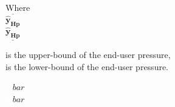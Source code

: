 \begin{minipage}[t]{0.20\textwidth}
Where\\
\hspace*{8mm} $ \overline{\bm{\hat{y}_{Hp}}} $ \\
\hspace*{8mm} $ \underline{\bm{\hat{y}_{Hp}}} $ 
\end{minipage}
\begin{minipage}[t]{0.68\textwidth}
\vspace*{2mm}
is the upper-bound of the end-user pressure, \\
is the lower-bound of the end-user pressure. 
\end{minipage}
\begin{minipage}[t]{0.10\textwidth}
\vspace*{1.8mm}
\textcolor{White}{te}$\unit{bar}$\\
\textcolor{White}{te}$\unit{bar}$
\end{minipage}

%



